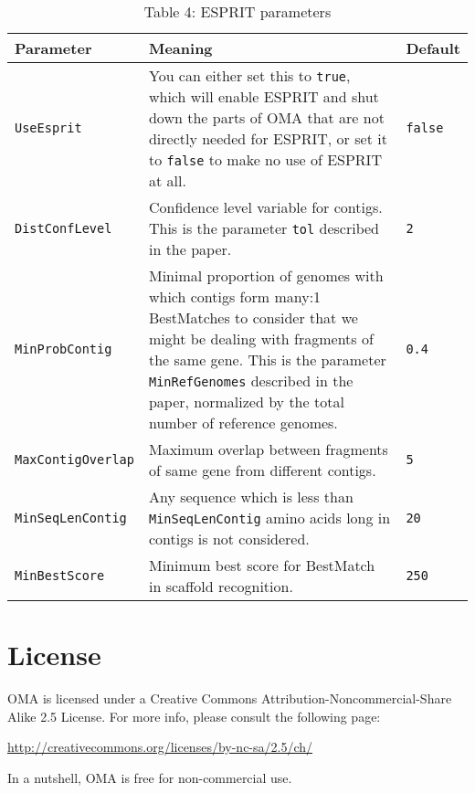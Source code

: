 \documentclass{scrartcl}
\begin{document}
\begin{table}[!ht]
\begin{tabular}{ l p{9cm} p{2cm} }
\textbf{Parameter} & \textbf{Meaning} & \textbf{Default}\\
\hline
\texttt{UseEsprit} & 
\noindent You can either set this to \texttt{true}, which will enable ESPRIT and shut down the parts of
                        OMA that are not directly needed for ESPRIT, or set it
                        to \texttt{false} to make no use of ESPRIT at all.
 & \texttt{false}\\
\texttt{DistConfLevel} & 
\noindent Confidence level variable for contigs.
                        This is the parameter \texttt{tol} described in the
                        paper.
 & \texttt{2}\\
\texttt{MinProbContig} & 
\noindent Minimal proportion of genomes with which
                        contigs form many:1 BestMatches to consider that we
                        might be dealing with fragments of the same gene.
                        This is the parameter \texttt{MinRefGenomes} described in the paper, normalized by the total
                        number of reference genomes.
 & \texttt{0.4}\\
\texttt{MaxContigOverlap} & 
\noindent Maximum overlap between fragments of
                        same gene from different contigs.
 & \texttt{5}\\
\texttt{MinSeqLenContig} & 
\noindent Any sequence which is less than \texttt{MinSeqLenContig} amino acids long in contigs
                        is not considered.
 & \texttt{20}\\
\texttt{MinBestScore} & 
\noindent Minimum best score for BestMatch in
                        scaffold recognition.
 & \texttt{250}\\
\end{tabular}
\caption{Table 4: ESPRIT parameters}
\end{table}
\section{License}
\noindent OMA is licensed under a Creative Commons 
Attribution-Noncommercial-Share Alike 2.5 License. For more info, please 
consult the following page:

\noindent \href{http://creativecommons.org/licenses/by-nc-sa/2.5/ch/}{http://creativecommons.org/licenses/by-nc-sa/2.5/ch/}

\noindent In a nutshell, OMA is free for non-commercial use.
\end{document}
